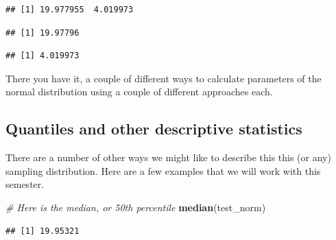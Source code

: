 \documentclass[
]{book}
\newenvironment{Shaded}{\begin{snugshade}}{\end{snugshade}}
\newcommand{\CommentTok}[1]{\textcolor[rgb]{0.56,0.35,0.01}{\textit{#1}}}
\newcommand{\DataTypeTok}[1]{\textcolor[rgb]{0.13,0.29,0.53}{#1}}
\newcommand{\DecValTok}[1]{\textcolor[rgb]{0.00,0.00,0.81}{#1}}
\newcommand{\FloatTok}[1]{\textcolor[rgb]{0.00,0.00,0.81}{#1}}
\newcommand{\KeywordTok}[1]{\textcolor[rgb]{0.13,0.29,0.53}{\textbf{#1}}}
\newcommand{\NormalTok}[1]{#1}
\newcommand{\OperatorTok}[1]{\textcolor[rgb]{0.81,0.36,0.00}{\textbf{#1}}}
\begin{document}
\begin{verbatim}
## [1] 19.977955  4.019973
\end{verbatim}

\begin{Shaded}
\end{Shaded}

\begin{verbatim}
## [1] 19.97796
\end{verbatim}

\begin{Shaded}
\end{Shaded}

\begin{verbatim}
## [1] 4.019973
\end{verbatim}

There you have it, a couple of different ways to calculate parameters of the normal distribution using a couple of different approaches each.

\hypertarget{quantiles-and-other-descriptive-statistics}{%
\subsection{Quantiles and other descriptive statistics}\label{quantiles-and-other-descriptive-statistics}}

There are a number of other ways we might like to describe this this (or any) sampling distribution. Here are a few examples that we will work with this semester.

\begin{Shaded}
\begin{Highlighting}[]
\CommentTok{# Here is the median, or 50th percentile}
\KeywordTok{median}\NormalTok{(test_norm) }
\end{Highlighting}
\end{Shaded}

\begin{verbatim}
## [1] 19.95321
\end{verbatim}

\begin{Shaded}
\end{Shaded}
\end{document}

